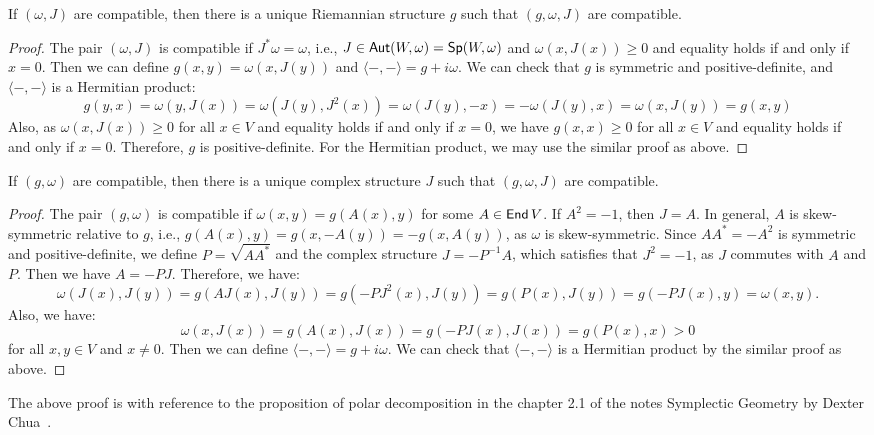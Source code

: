 \begin{proposition}
	If $(\omega, J)$ are compatible, then there is a unique Riemannian structure $g$ such that $(g, \omega, J)$ are compatible.
\end{proposition}
\begin{proof}
	The pair $(\omega, J)$ is compatible if $J^* \omega = \omega$, i.e., $J \in \operatorname{\text{\normalfont\sffamily Aut}}(W, \omega) = \operatorname{\text{\normalfont\sffamily Sp}}(W, \omega)$ and $\omega (x, J(x)) \geq 0$ and equality holds if and only if $x = 0$. Then we can define $g(x, y) = \omega (x, J(y))$ and $\langle -, - \rangle = g + i \omega$. We can check that $g$ is symmetric and positive-definite, and $\langle -, - \rangle$ is a Hermitian product:
	\[
		g(y, x) = \omega (y, J(x)) = \omega (J(y), J^2(x)) = \omega (J(y), -x) = -\omega (J(y), x) = \omega (x, J(y)) = g(x, y)
	\]
	Also, as $\omega (x, J(x)) \geq 0$ for all $x \in V$ and equality holds if and only if $x = 0$, we have $g(x, x) \geq 0$ for all $x \in V$ and equality holds if and only if $x = 0$. Therefore, $g$ is positive-definite. For the Hermitian product, we may use the similar proof as above.
\end{proof}

\begin{proposition}
	If $(g, \omega)$ are compatible, then there is a unique complex structure $J$ such that $(g, \omega, J)$ are compatible.
\end{proposition}
\begin{proof}
	The pair $(g, \omega)$ is compatible if $\omega (x, y) = g(A(x), y)$ for some $A \in \operatorname{\text{\normalfont\sffamily End}}{V}$. If $A^2 = -1$, then $J = A$. In general, $A$ is skew-symmetric relative to $g$, i.e., $g(A(x), y) = g(x, -A(y)) = -g(x, A(y))$, as $\omega$ is skew-symmetric. Since $A A^* = -A^2$ is symmetric and positive-definite, we define $P = \sqrt{A A^*}$ and the complex structure $J = -P^{-1} A$, which satisfies that $J^2 = -1$, as $J$ commutes with $A$ and $P$. Then we have $A = -P J$. Therefore, we have:
	\[
		\omega (J(x), J(y)) = g(AJ(x), J(y)) = g(-PJ^2(x), J(y)) = g(P(x), J(y)) = g(-PJ(x), y) = \omega (x, y).
	\]
	Also, we have:
	\[
		\omega (x, J(x)) = g(A(x), J(x)) = g(-PJ(x), J(x)) = g(P(x), x) > 0
	\]
	for all $x, y \in V$ and $x \neq 0$. Then we can define $\langle -, - \rangle = g + i \omega$. We can check that $\langle -, - \rangle$ is a Hermitian product by the similar proof as above.
\end{proof}

The above proof is with reference to the proposition of polar decomposition in the chapter 2.1 of the notes Symplectic Geometry by Dexter Chua~\cite{chua2018symplectic}.

